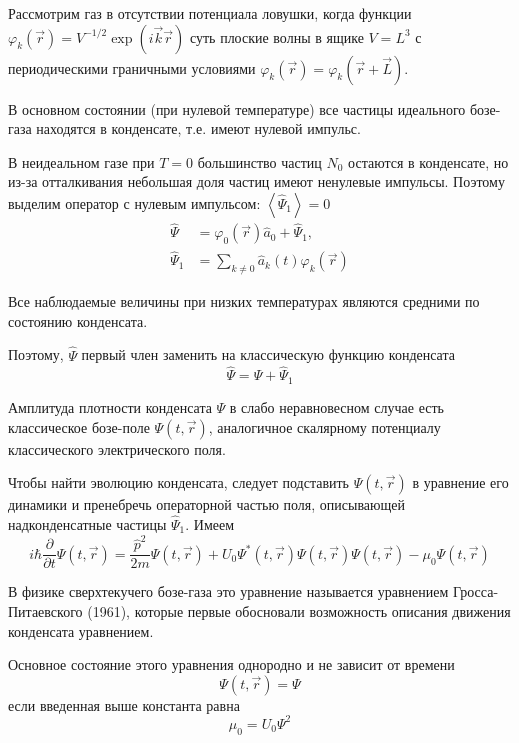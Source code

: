 \documentclass[a4paper,12pt]{article} %
\begin{document}
\begin{ttask}
Рассмотрим газ в отсутствии потенциала ловушки, 
когда функции $\varphi_{k}(\vec{r})=V^{-1 / 2} \exp (i \vec{k} \vec{r})$ 
суть плоские волны в ящике $V=L^{3}$ с периодическими граничными условиями 
$\varphi_{k}(\vec{r})=\varphi_{k}(\vec{r}+\vec{L})$. 



В основном состоянии (при нулевой температуре) все частицы идеального бозе-газа находятся в конденсате, 
т.е. имеют нулевой импульс. 

В неидеальном газе при $T=0$ большинство частиц $N_{0}$ остаются в конденсате, 
но из-за отталкивания небольшая доля частиц имеют ненулевые импульсы. 
Поэтому выделим оператор с нулевым импульсом: 
$\left\langle\hat{\Psi}_{1}\right\rangle=0 $
$$
\begin{aligned}
	\hat{\Psi} &=\varphi_{0}(\vec{r}) \hat{a}_{0}+\hat{\Psi}_{1},
	\\
	\hat{\Psi}_{1} &=\sum_{k \neq 0} \hat{a}_{k}(t) \varphi_{k}(\vec{r})
\end{aligned}
$$



Все наблюдаемые величины при низких температурах являются средними по состоянию конденсата. 

Поэтому, $ \hat{\Psi} $ первый член заменить на классическую функцию конденсата
$$
\hat{\Psi}=\Psi+\hat{\Psi}_{1}
$$



Амплитуда плотности конденсата $\Psi$ в слабо неравновесном случае есть классическое бозе-поле $\Psi(t, \vec{r})$,
аналогичное скалярному потенциалу классического электрического поля. 


Чтобы найти эволюцию конденсата, следует подставить
$\Psi(t, \vec{r})$ в уравнение его динамики 
и пренебречь операторной частью поля, 
описывающей надконденсатные частицы $\hat{\Psi}_{1}$. 
Имеем
$$
i \hbar \frac{\partial}{\partial t} \Psi(t, \vec{r})=\frac{\hat{p}^{2}}{2 m} \Psi(t, \vec{r})+U_{0} \Psi^{*}(t, \vec{r}) \Psi(t, \vec{r}) \Psi(t, \vec{r})-\mu_{0} \Psi(t, \vec{r})
$$


В физике сверхтекучего бозе-газа это уравнение называется уравнением Гросса-Питаевского (1961), 
которые первые обосновали возможность описания движения конденсата уравнением. 



Основное состояние этого уравнения однородно и не зависит от времени
$$
\Psi(t, \vec{r})=\Psi
$$
если введенная выше константа равна
$$
\mu_{0}=U_{0} \Psi^{2}
$$




\end{ttask}
\end{document}
